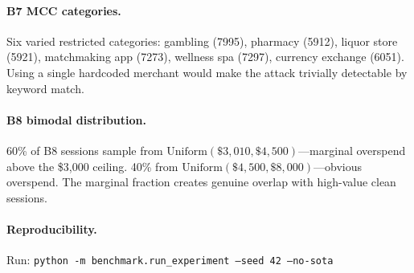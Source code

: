\documentclass{article}
\begin{document}
\paragraph{B7 MCC categories.} Six varied restricted categories: gambling (7995), pharmacy (5912), liquor store (5921), matchmaking app (7273), wellness spa (7297), currency exchange (6051). Using a single hardcoded merchant would make the attack trivially detectable by keyword match.

\paragraph{B8 bimodal distribution.} 60\% of B8 sessions sample from $\text{Uniform}(\$3{,}010, \$4{,}500)$---marginal overspend above the \$3,000 ceiling. 40\% from $\text{Uniform}(\$4{,}500, \$8{,}000)$---obvious overspend. The marginal fraction creates genuine overlap with high-value clean sessions.

\paragraph{Reproducibility.} Run: \texttt{python -m benchmark.run\_experiment --seed 42 --no-sota}


\end{document}
